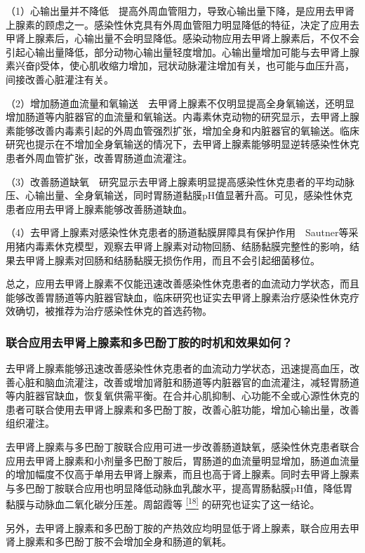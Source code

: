 （1）心输出量并不降低　提高外周血管阻力，导致心输出量下降，是应用去甲肾上腺素的顾虑之一。感染性休克具有外周血管阻力明显降低的特征，决定了应用去甲肾上腺素后，心输出量不会明显降低。感染动物应用去甲肾上腺素后，不仅不会引起心输出量降低，部分动物心输出量轻度增加。心输出量增加可能与去甲肾上腺素兴奋β受体，使心肌收缩力增加，冠状动脉灌注增加有关，也可能与血压升高，间接改善心脏灌注有关。

（2）增加肠道血流量和氧输送　去甲肾上腺素不仅明显提高全身氧输送，还明显增加肠道等内脏器官的血流量和氧输送。内毒素休克动物的研究显示，去甲肾上腺素能够改善内毒素引起的外周血管强烈扩张，增加全身和内脏器官的氧输送。临床研究也提示在不增加全身氧输送的情况下，去甲肾上腺素能够明显逆转感染性休克患者外周血管扩张，改善胃肠道血流灌注。

（3）改善肠道缺氧　研究显示去甲肾上腺素明显提高感染性休克患者的平均动脉压、心输出量、全身氧输送，同时胃肠道黏膜pH值显著升高。可见，感染性休克患者应用去甲肾上腺素能够改善肠道缺血。

（4）去甲肾上腺素对感染性休克患者的肠道黏膜屏障具有保护作用　Sautner等采用猪内毒素休克模型，观察去甲肾上腺素对动物回肠、结肠黏膜完整性的影响，结果去甲肾上腺素对回肠和结肠黏膜无损伤作用，而且不会引起细菌移位。

总之，应用去甲肾上腺素不仅能迅速改善感染性休克患者的血流动力学状态，而且能够改善胃肠道等内脏器官缺血，临床研究也证实去甲肾上腺素治疗感染性休克疗效确切，被推荐为治疗感染性休克的首选药物。

\subsubsection{联合应用去甲肾上腺素和多巴酚丁胺的时机和效果如何？}

去甲肾上腺素能够迅速改善感染性休克患者的血流动力学状态，迅速提高血压，改善心脏和脑血流灌注，改善或增加肾脏和肠道等内脏器官的血流灌注，减轻胃肠道等内脏器官缺血，恢复氧供需平衡。在合并心肌抑制、心功能不全或心源性休克的患者可联合使用去甲肾上腺素和多巴酚丁胺，改善心脏功能，增加心输出量，改善组织灌注。

去甲肾上腺素与多巴酚丁胺联合应用可进一步改善肠道缺氧，感染性休克患者联合应用去甲肾上腺素和小剂量多巴酚丁胺后，胃肠道的血流量明显增加，肠道血流量的增加幅度不仅高于单用去甲肾上腺素，而且也高于肾上腺素。同时去甲肾上腺素与多巴酚丁胺联合应用也明显降低动脉血乳酸水平，提高胃肠黏膜pH值，降低胃黏膜与动脉血二氧化碳分压差。周韶霞等
\protect\hyperlink{text00008.htmlux5cux23ch18-7}{\textsuperscript{{[}18{]}}}
的研究也证实了这一结论。

另外，去甲肾上腺素和多巴酚丁胺的产热效应均明显低于肾上腺素，联合应用去甲肾上腺素和多巴酚丁胺不会增加全身和肠道的氧耗。

